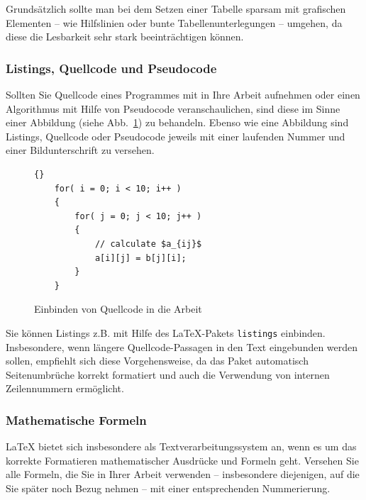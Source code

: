 \noindent
Grundsätzlich sollte man bei dem Setzen einer Tabelle sparsam mit grafischen Elementen -- wie Hilfslinien oder bunte Tabellenunterlegungen -- umgehen, da diese die Lesbarkeit sehr stark beeinträchtigen können.


\subsubsection{Listings, Quellcode und Pseudocode}

Sollten Sie Quellcode eines Programmes mit in Ihre Arbeit aufnehmen oder einen Algorithmus mit Hilfe von Pseudocode veranschaulichen, sind diese im Sinne einer Abbildung (siehe Abb.~\ref{fig_Abb3}) zu behandeln.
Ebenso wie eine Abbildung sind Listings, Quellcode oder Pseudocode jeweils mit einer laufenden Nummer und einer Bildunterschrift zu versehen.

\begin{figure}[ht]
\lstset{language=c++}
\begin{lstlisting}{}
    for( i = 0; i < 10; i++ )
    {
        for( j = 0; j < 10; j++ )
        {
            // calculate $a_{ij}$
            a[i][j] = b[j][i];
        }
    }

\end{lstlisting}
  \caption{Einbinden von Quellcode in die Arbeit}
  \label{fig_Abb3}
\end{figure}

Sie können Listings z.B. mit Hilfe des \LaTeX-Pakets {\tt listings} einbinden.
Insbesondere, wenn längere Quellcode-Passagen in den Text eingebunden werden sollen, empfiehlt sich diese Vorgehensweise, da das Paket automatisch Seitenumbrüche korrekt formatiert und auch die Verwendung von internen Zeilennummern ermöglicht.

\subsubsection{Mathematische Formeln}

{\LaTeX} bietet sich insbesondere als Textverarbeitungssystem an, wenn es um das korrekte Formatieren mathematischer Ausdrücke und Formeln geht.
Versehen Sie alle Formeln, die Sie in Ihrer Arbeit verwenden -- insbesondere diejenigen, auf die Sie später noch Bezug nehmen --  mit einer entsprechenden Nummerierung.

